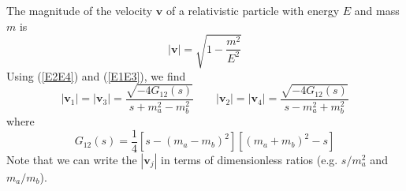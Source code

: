 The magnitude of the velocity $\mathbf{v}$ of a relativistic particle with energy $E$ and mass $m$ is
\begin{equation}
	|\mathbf{v}| = \sqrt{1 - \frac{m^{2}}{E^{2}}}
\end{equation}
Using (\ref{E2E4}) and (\ref{E1E3}), we find
\begin{equation}
	|\mathbf{v}_{1}| = |\mathbf{v}_{3}| = \frac{\sqrt{-4 G_{12}(s)}}{s + m_{a}^{2} - m_{b}^{2}} \qquad |\mathbf{v}_{2}| = |\mathbf{v}_{4}| = \frac{\sqrt{-4 G_{12}(s)}}{s - m_{a}^{2} + m_{b}^{2}}
\end{equation}
where
\begin{equation}
	G_{12}(s) = \frac{1}{4} [s - (m_{a} - m_{b})^{2}] [(m_{a} + m_{b})^{2} - s]
\end{equation}
Note that we can write the $|\mathbf{v}_{j}|$ in terms of dimensionless ratios (e.g. $s/m_{a}^{2}$ and $m_{a} / m_{b}$).

